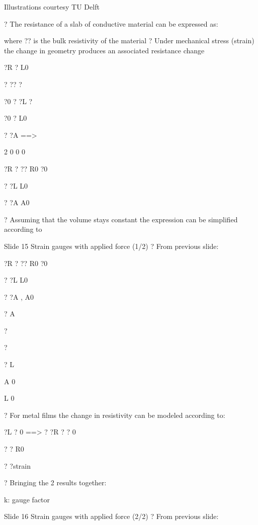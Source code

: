 \documentclass[2pt,landscape]{article}
\begin{document}
\begin{multicols*}{5}
Illustrations courtesy TU Delft



?	The resistance of a slab of conductive material can be expressed as:



where ?? is the bulk resistivity of the material
?	Under mechanical stress (strain) the change
in geometry produces an associated resistance 
change


?R ? L0


? ?? ?


?0 ? ?L ?


?0 ? L0


? ?A ==>


2
0	0	0


?R ? ??
R0	?0


? ?L
L0


? ?A
A0


?	Assuming that the volume stays constant
the expression can be simplified according to


Slide 15	Strain gauges with applied force (1/2)
?	From previous slide:



?R ? ??
R0	?0


? ?L
L0


? ?A ,
A0


?
A

?

?

?
L

A
0

L
0











?	For metal films the change in resistivity can be 
modeled according to:


?L ? 0 ==> ? ?R ?	? 0


?
? R0


?
?strain






?	Bringing the 2 results together:



k: gauge factor


Slide 16	Strain gauges with applied force (2/2)
?	From previous slide:











\end{multicols*}
\end{document}
